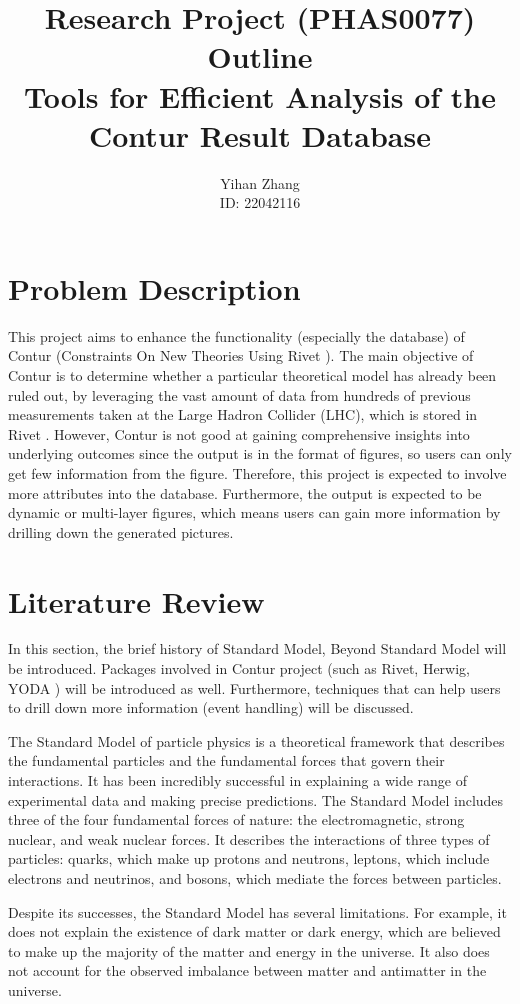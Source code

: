 \documentclass[10pt]{article}
\title{Research Project (PHAS0077) Outline 
	\\ {\small Tools for Efficient Analysis of the Contur Result Database}}
\author{Yihan Zhang \\ ID: 22042116 }
\date{}
\begin{document}
	\maketitle	
	\section{Problem Description}
	This project aims to enhance the functionality (especially the database) of Contur \cite{butterworth2017constraining} (Constraints On New Theories Using Rivet ). The main objective of Contur is to determine whether a particular theoretical model has already been ruled out, by leveraging the vast amount of data from hundreds of previous measurements taken at the Large Hadron Collider (LHC), which is stored in Rivet \cite{Bierlich_2020}. 	However, Contur is not good at gaining comprehensive insights into underlying outcomes since the output is in the format of figures, so users can only get few information from the figure. Therefore, this project is expected to involve more attributes into the database. Furthermore, the output is expected to be dynamic or multi-layer figures, which means users can gain more information by drilling down the generated pictures.
	\section{Literature Review}
	In this section, the brief history of Standard Model, Beyond Standard Model will be introduced. Packages involved in Contur project (such as Rivet, Herwig, YODA \cite{YODA}) will be introduced as well. Furthermore, techniques that can help users to drill down more information (event handling) will be discussed.
	
	The Standard Model of particle physics is a theoretical framework that describes the fundamental particles and the fundamental forces that govern their interactions. It has been incredibly successful in explaining a wide range of experimental data and making precise predictions. The Standard Model includes three of the four fundamental forces of nature: the electromagnetic, strong nuclear, and weak nuclear forces. It describes the interactions of three types of particles: quarks, which make up protons and neutrons, leptons, which include electrons and neutrinos, and bosons, which mediate the forces between particles.
	
	Despite its successes, the Standard Model has several limitations. For example, it does not explain the existence of dark matter or dark energy, which are believed to make up the majority of the matter and energy in the universe. It also does not account for the observed imbalance between matter and antimatter in the universe.
	
\end{document}
